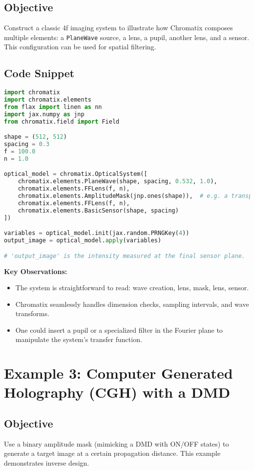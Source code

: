 \documentclass[a4paper,12pt]{report}
\begin{document}
\subsection{Objective}
Construct a classic 4f imaging system to illustrate how Chromatix composes multiple elements: a \texttt{PlaneWave} source, a lens, a pupil, another lens, and a sensor. This configuration can be used for spatial filtering.

\subsection{Code Snippet}
\begin{lstlisting}[language=Python]
import chromatix
import chromatix.elements
from flax import linen as nn
import jax.numpy as jnp
from chromatix.field import Field

shape = (512, 512)
spacing = 0.3
f = 100.0
n = 1.0

optical_model = chromatix.OpticalSystem([
    chromatix.elements.PlaneWave(shape, spacing, 0.532, 1.0),
    chromatix.elements.FFLens(f, n),
    chromatix.elements.AmplitudeMask(jnp.ones(shape)),  # e.g. a transparent mask
    chromatix.elements.FFLens(f, n),
    chromatix.elements.BasicSensor(shape, spacing)
])

variables = optical_model.init(jax.random.PRNGKey(4))
output_image = optical_model.apply(variables)

# 'output_image' is the intensity measured at the final sensor plane.
\end{lstlisting}
\noindent \textbf{Key Observations:}
\begin{itemize}
    \item The system is straightforward to read: wave creation, lens, mask, lens, sensor.
    \item Chromatix seamlessly handles dimension checks, sampling intervals, and wave transforms.
    \item One could insert a pupil or a specialized filter in the Fourier plane to manipulate the system’s transfer function.
\end{itemize}

\section{Example 3: Computer Generated Holography (CGH) with a DMD}
\subsection{Objective}
Use a binary amplitude mask (mimicking a DMD with ON/OFF states) to generate a target image at a certain propagation distance. This example demonstrates inverse design.
\end{document}
